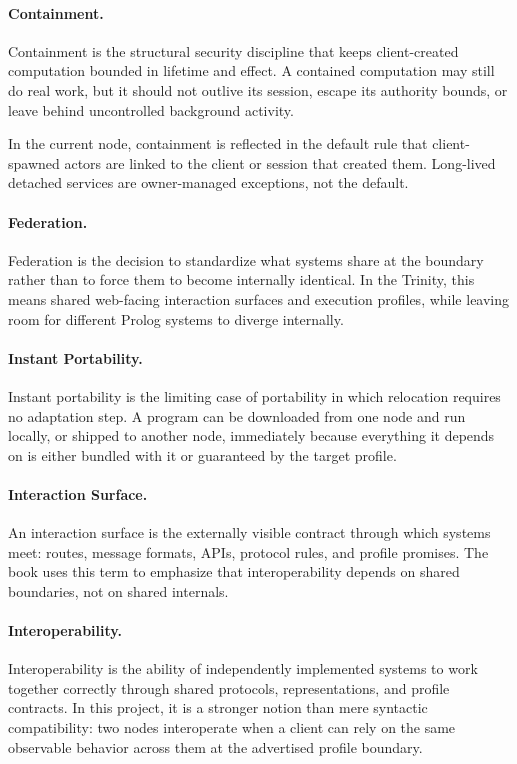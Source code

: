 \paragraph{Containment.}
Containment is the structural security discipline that keeps client-created
computation bounded in lifetime and effect. A contained computation may still do
real work, but it should not outlive its session, escape its authority bounds,
or leave behind uncontrolled background activity.

In the current node, containment is reflected in the default rule that
client-spawned actors are linked to the client or session that created them.
Long-lived detached services are owner-managed exceptions, not the default.

\paragraph{Federation.}
Federation is the decision to standardize what systems share at the boundary
rather than to force them to become internally identical. In the Trinity, this
means shared web-facing interaction surfaces and execution profiles, while
leaving room for different Prolog systems to diverge internally.

\paragraph{Instant Portability.}
Instant portability is the limiting case of portability in which relocation
requires no adaptation step. A program can be downloaded from one node and run
locally, or shipped to another node, immediately because everything it depends
on is either bundled with it or guaranteed by the target profile.

\paragraph{Interaction Surface.}
An interaction surface is the externally visible contract through which systems
meet: routes, message formats, APIs, protocol rules, and profile promises. The
book uses this term to emphasize that interoperability depends on shared
boundaries, not on shared internals.

\paragraph{Interoperability.}
Interoperability is the ability of independently implemented systems to work
together correctly through shared protocols, representations, and profile
contracts. In this project, it is a stronger notion than mere syntactic
compatibility: two nodes interoperate when a client can rely on the same
observable behavior across them at the advertised profile boundary.

